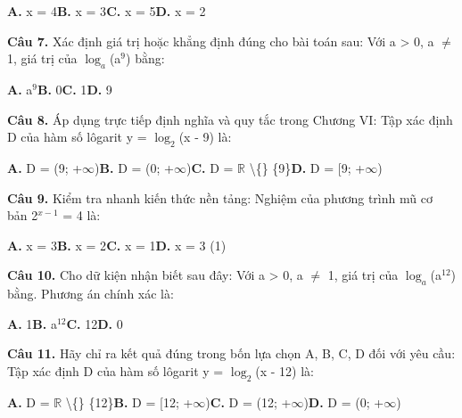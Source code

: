 \documentclass[11pt,a4paper]{article}
\begin{document}
\hspace*{1.5em}\textbf{A.} x = 4\quad\quad \textbf{B.} x = 3\quad\quad \textbf{C.} x = 5\quad\quad \textbf{D.} x = 2\par\vspace{2pt}
\textbf{\color{primary} Câu 7.} Xác định giá trị hoặc khẳng định đúng cho bài toán sau: Với a > 0, a $\ne$ 1, giá trị của $\log_a$(a$^{9}$) bằng:\par
\hspace*{1.5em}\textbf{A.} a$^{9}$\quad\quad \textbf{B.} 0\quad\quad \textbf{C.} 1\quad\quad \textbf{D.} 9\par\vspace{2pt}
\textbf{\color{primary} Câu 8.} Áp dụng trực tiếp định nghĩa và quy tắc trong Chương VI: Tập xác định D của hàm số lôgarit y = $\log_2$(x - 9) là:\par
\hspace*{1.5em}\textbf{A.} D = (9; +$\infty$)\quad\quad \textbf{B.} D = (0; +$\infty$)\quad\quad \textbf{C.} D = $\mathbb{R}$ \textbackslash\{\} \{9\}\quad\quad \textbf{D.} D = [9; +$\infty$)\par\vspace{2pt}
\textbf{\color{primary} Câu 9.} Kiểm tra nhanh kiến thức nền tảng: Nghiệm của phương trình mũ cơ bản 2$^{x - 1}$ = 4 là:\par
\hspace*{1.5em}\textbf{A.} x = 3\quad\quad \textbf{B.} x = 2\quad\quad \textbf{C.} x = 1\quad\quad \textbf{D.} x = 3 (1)\par\vspace{2pt}
\textbf{\color{primary} Câu 10.} Cho dữ kiện nhận biết sau đây: Với a > 0, a $\ne$ 1, giá trị của $\log_a$(a$^{12}$) bằng. Phương án chính xác là:\par
\hspace*{1.5em}\textbf{A.} 1\quad\quad \textbf{B.} a$^{12}$\quad\quad \textbf{C.} 12\quad\quad \textbf{D.} 0\par\vspace{2pt}
\textbf{\color{primary} Câu 11.} Hãy chỉ ra kết quả đúng trong bốn lựa chọn A, B, C, D đối với yêu cầu: Tập xác định D của hàm số lôgarit y = $\log_2$(x - 12) là:\par
\hspace*{1.5em}\textbf{A.} D = $\mathbb{R}$ \textbackslash\{\} \{12\}\quad\quad \textbf{B.} D = [12; +$\infty$)\quad\quad \textbf{C.} D = (12; +$\infty$)\quad\quad \textbf{D.} D = (0; +$\infty$)\par\vspace{2pt}
\end{document}
